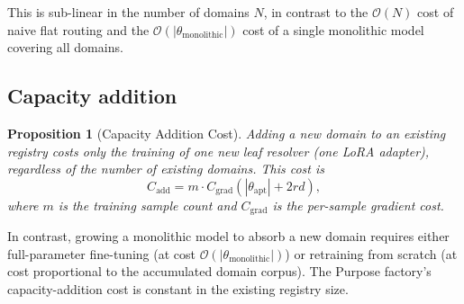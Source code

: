 \documentclass[twocolumn,11pt,a4paper]{article}
\newtheorem{proposition}[theorem]{Proposition}
\begin{document}
This is sub-linear in the number of domains $N$, in contrast to the $\mathcal{O}(N)$ cost of naive flat routing and the $\mathcal{O}(|\theta_{\mathrm{monolithic}}|)$ cost of a single monolithic model covering all domains.

\subsection{Capacity addition}

\begin{proposition}[Capacity Addition Cost]
\label{prop:capacity-addition}
Adding a new domain to an existing registry costs only the training of one new leaf resolver (one LoRA adapter), regardless of the number of existing domains. This cost is
\begin{equation}
C_{\mathrm{add}} = m \cdot C_{\mathrm{grad}}(|\theta_{\mathrm{apt}}| + 2rd),
\end{equation}
where $m$ is the training sample count and $C_{\mathrm{grad}}$ is the per-sample gradient cost.
\end{proposition}

In contrast, growing a monolithic model to absorb a new domain requires either full-parameter fine-tuning (at cost $\mathcal{O}(|\theta_{\mathrm{monolithic}}|)$) or retraining from scratch (at cost proportional to the accumulated domain corpus). The Purpose factory's capacity-addition cost is constant in the existing registry size.
\end{document}
